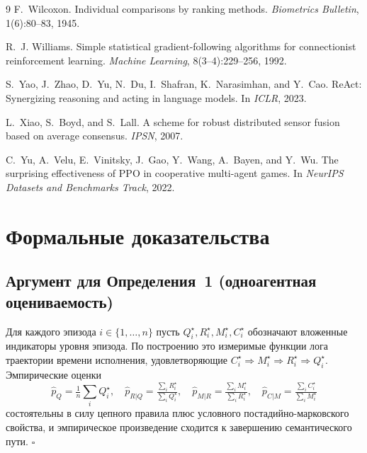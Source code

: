 \documentclass{article}
\begin{document}
{\begin{thebibliography}{9}
F.~Wilcoxon.
\newblock Individual comparisons by ranking methods.
\newblock \emph{Biometrics Bulletin}, 1(6):80--83, 1945.

R.~J. Williams.
\newblock Simple statistical gradient-following algorithms for connectionist reinforcement learning.
\newblock \emph{Machine Learning}, 8(3--4):229--256, 1992.

S.~Yao, J.~Zhao, D.~Yu, N.~Du, I.~Shafran, K.~Narasimhan, and Y.~Cao.
\newblock ReAct: Synergizing reasoning and acting in language models.
\newblock In \emph{ICLR}, 2023.

L.~Xiao, S.~Boyd, and S.~Lall.
\newblock A scheme for robust distributed sensor fusion based on average consensus.
\newblock \emph{IPSN}, 2007.

C.~Yu, A.~Velu, E.~Vinitsky, J.~Gao, Y.~Wang, A.~Bayen, and Y.~Wu.
\newblock The surprising effectiveness of PPO in cooperative multi-agent games.
\newblock In \emph{NeurIPS Datasets and Benchmarks Track}, 2022.

\end{thebibliography}
}

\appendix

\section{Формальные доказательства}
\label{app:proofs}

\subsection{Аргумент для Определения~1 (одноагентная оцениваемость)}

Для каждого эпизода $i \in \{1,\dots,n\}$ пусть $Q_i^\star, R_i^\star, M_i^\star, C_i^\star$ обозначают вложенные индикаторы уровня эпизода. По построению это измеримые функции лога траектории времени исполнения, удовлетворяющие $C_i^\star \Rightarrow M_i^\star \Rightarrow R_i^\star \Rightarrow Q_i^\star$. Эмпирические оценки
\[
\hat p_Q = \tfrac{1}{n}\sum_i Q_i^\star,\quad
\hat p_{R|Q} = \tfrac{\sum_i R_i^\star}{\sum_i Q_i^\star},\quad
\hat p_{M|R} = \tfrac{\sum_i M_i^\star}{\sum_i R_i^\star},\quad
\hat p_{C|M} = \tfrac{\sum_i C_i^\star}{\sum_i M_i^\star}
\]
состоятельны в силу цепного правила плюс условного постадийно-марковского свойства, и эмпирическое произведение сходится к завершению семантического пути. \hfill$\square$
\end{document}
